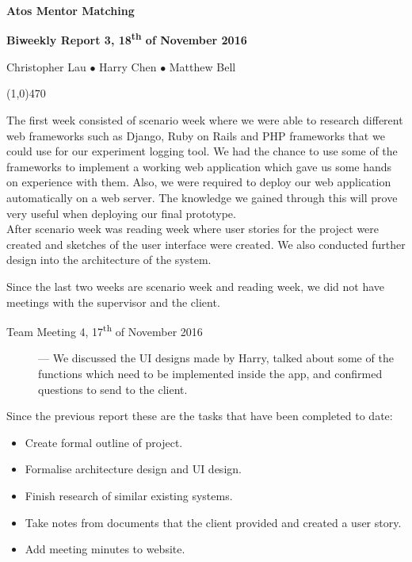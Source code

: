 \documentclass[11pt]{report}
\begin{document}
\centerline{{\LARGE \bf Atos Mentor Matching}}

\centerline{ \large \bf Biweekly Report 3, 18\textsuperscript{th} of November 2016}
\centerline{ Christopher Lau $\bullet$ Harry Chen $\bullet$ Matthew Bell }
\noindent
\line(1,0){470}\\


\smallskip

\noindent
The first week consisted of scenario week where we were able to research different web frameworks such as Django, Ruby on Rails and PHP frameworks that we could use for our experiment logging tool. We had the chance to use some of the frameworks to implement a working web application which gave us some hands on experience with them. Also, we were required to deploy our web application automatically on a web server. The knowledge we gained through this will prove very useful when deploying our final prototype.\\

\noindent
After scenario week was reading week where user stories for the project were created and sketches of the user interface were created. We also conducted further design into the architecture of the system.\\

\bigskip
{}
\smallskip

\noindent
Since the last two weeks are scenario week and reading week, we did not have meetings with the supervisor and the client.\\

\begin{description}
  \item[Team Meeting 4, 17\textsuperscript{th} of November 2016] --- We discussed the UI designs made by Harry, talked about some of the functions which need to be implemented inside the app, and confirmed questions to send to the client.
\end{description}

\bigskip
{}
\smallskip

\noindent
Since the previous report these are the tasks that have been completed to date:
\begin{itemize}
  \item Create formal outline of project.
  \item Formalise architecture design and UI design.
  \item Finish research of similar existing systems.
  \item Take notes from documents that the client provided and created a user story.
  \item Add meeting minutes to website.
\end{itemize}
\end{document}
